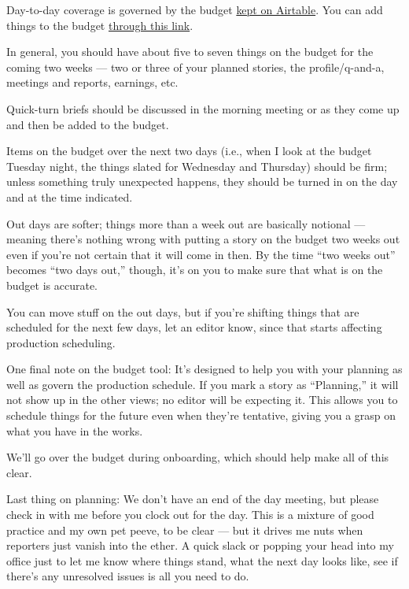 \documentclass[
  11pt,
  american,
  letterpaperpaper,
  extrafontsizes,onecolumn,openright
  ]{memoir}
\begin{document}
Day-to-day coverage is governed by the budget \href{https://airtable.com/appd845fCRPfzGyrt/tblx8KlY4D5nLOKB3/viwcJlT5urTqgUus1?blocks=hide}{kept on Airtable}. You can add things to the budget \href{https://airtable.com/appd845fCRPfzGyrt/shrab8qrVWmUZD1Ea}{through this link}.

In general, you should have about five to seven things on the budget for the coming two weeks --- two or three of your planned stories, the profile/q-and-a, meetings and reports, earnings, etc.

Quick-turn briefs should be discussed in the morning meeting or as they come up and then be added to the budget.

Items on the budget over the next two days (i.e., when I look at the budget Tuesday night, the things slated for Wednesday and Thursday) should be firm; unless something truly unexpected happens, they should be turned in on the day and at the time indicated.

Out days are softer; things more than a week out are basically notional --- meaning there's nothing wrong with putting a story on the budget two weeks out even if you're not certain that it will come in then. By the time \enquote{two weeks out} becomes \enquote{two days out,} though, it's on you to make sure that what is on the budget is accurate.

You can move stuff on the out days, but if you're shifting things that are scheduled for the next few days, let an editor know, since that starts affecting production scheduling.

One final note on the budget tool: It's designed to help you with your planning as well as govern the production schedule. If you mark a story as \enquote{Planning,} it will not show up in the other views; no editor will be expecting it. This allows you to schedule things for the future even when they're tentative, giving you a grasp on what you have in the works.

\leavevmode{}%
\begin{greybox}[frametitle=Onboarding Path]
We'll go over the budget during onboarding, which should help make all of this clear.

\end{greybox}

Last thing on planning: We don't have an end of the day meeting, but please check in with me before you clock out for the day. This is a mixture of good practice and my own pet peeve, to be clear --- but it drives me nuts when reporters just vanish into the ether. A quick slack or popping your head into my office just to let me know where things stand, what the next day looks like, see if there's any unresolved issues is all you need to do.
\end{document}
